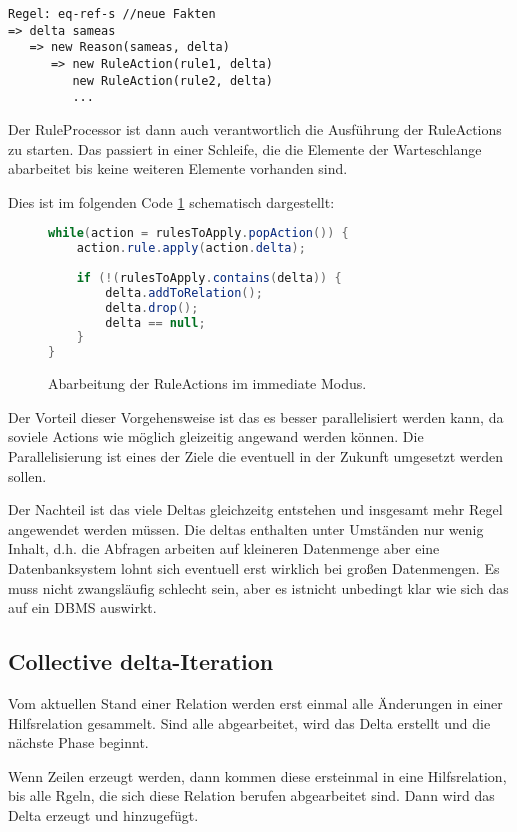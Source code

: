 \begin{verbatim}
Regel: eq-ref-s //neue Fakten
=> delta sameas
   => new Reason(sameas, delta)
      => new RuleAction(rule1, delta)
         new RuleAction(rule2, delta)
         ...
\end{verbatim}

Der RuleProcessor ist dann auch verantwortlich die Ausführung der RuleActions zu starten. Das passiert in einer Schleife, die die Elemente der Warteschlange abarbeitet bis keine weiteren Elemente vorhanden sind.

Dies ist im folgenden Code \ref{code-immediate-delta-iteration} schematisch dargestellt:

\begin{figure}[htp]
	\caption{Abarbeitung der RuleActions im immediate Modus.}
	\label{code-immediate-delta-iteration}
	\begin{lstlisting}[language=Java]
while(action = rulesToApply.popAction()) {
	action.rule.apply(action.delta);
	
	if (!(rulesToApply.contains(delta)) {
		delta.addToRelation();
		delta.drop();
		delta == null;
	}
}
	\end{lstlisting}
\end{figure}


Der Vorteil dieser Vorgehensweise ist das es besser parallelisiert werden kann, da soviele Actions wie möglich gleizeitig angewand werden können. Die Parallelisierung ist eines der Ziele die eventuell in der Zukunft umgesetzt werden sollen.

Der Nachteil ist das viele Deltas gleichzeitg entstehen und insgesamt mehr Regel angewendet werden müssen. Die deltas enthalten unter Umständen nur wenig Inhalt, d.h. die Abfragen arbeiten auf kleineren Datenmenge aber eine Datenbanksystem lohnt sich eventuell erst wirklich bei großen Datenmengen. Es muss nicht zwangsläufig schlecht sein, aber es istnicht unbedingt klar wie sich das auf ein DBMS auswirkt.

\subsection{Collective delta-Iteration}

Vom aktuellen Stand einer Relation werden erst einmal alle Änderungen in einer Hilfsrelation gesammelt. Sind alle abgearbeitet, wird das Delta erstellt und die nächste Phase beginnt.

Wenn Zeilen erzeugt werden, dann kommen diese ersteinmal in eine Hilfsrelation, bis alle Rgeln, die sich diese Relation berufen abgearbeitet sind. Dann wird das Delta erzeugt und hinzugefügt.

